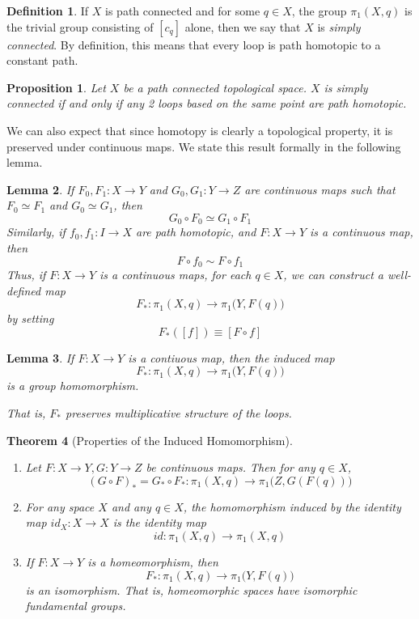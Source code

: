 \documentclass{article}
\newtheorem{theorem}{Theorem}[section]
\newtheorem{proposition}[theorem]{Proposition}
\newtheorem{lemma}[theorem]{Lemma}
\theoremstyle{remark}
\theoremstyle{definition}
\newtheorem{definition}{Definition}[section]
\begin{document}
  \begin{definition}
  If $X$ is path connected and for some $q \in X$, the group $\pi_1 (X, q)$ is the trivial group consisting of $[c_q]$ alone, then we say that $X$ is \textit{simply connected}. By definition, this means that every loop is path homotopic to a constant path. 
  \end{definition}

  \begin{proposition}
  Let $X$ be a path connected topological space. $X$ is simply connected if and only if any 2 loops based on the same point are path homotopic. 
  \end{proposition}

  We can also expect that since homotopy is clearly a topological property, it is preserved under continuous maps. We state this result formally in the following lemma.

  \begin{lemma}
  If $F_0, F_1: X \longrightarrow Y$ and $G_0, G_1: Y \longrightarrow Z$ are continuous maps such that $F_0 \simeq F_1$ and $G_0 \simeq G_1$, then 
  \[G_0 \circ F_0 \simeq G_1 \circ F_1\]
  Similarly, if $f_0, f_1: I \longrightarrow X$ are path homotopic, and $F: X \longrightarrow Y$ is a continuous map, then 
  \[F \circ f_0 \sim F \circ f_1\]
  Thus, if $F: X \longrightarrow Y$ is a continuous maps, for each $q \in X$, we can construct a well-defined map
  \[F_*: \pi_1 (X, q) \longrightarrow \pi_1 \big( Y, F(q)\big)\]
  by setting
  \[F_* ([f]) \equiv [F \circ f]\]
  \end{lemma}

  \begin{lemma}
  If $F: X \longrightarrow Y$ is a contiuous map, then the induced map 
  \[F_* : \pi_1(X, q) \longrightarrow \pi_1 \big( Y, F(q)\big)\]
  is a group homomorphism. 
  That is, $F_*$ preserves multiplicative structure of the loops. 
  \end{lemma}

  \begin{theorem}[Properties of the Induced Homomorphism]
  \begin{enumerate}
      \item Let $F: X \longrightarrow Y, G: Y \longrightarrow Z$ be continuous maps. Then for any $q \in X$, 
      \[(G \circ F)_* = G_* \circ F_* : \pi_1 (X, q) \longrightarrow \pi_1 \big(Z, G(F(q))\big)\]
      \item For any space $X$ and any $q \in X$, the homomorphism induced by the identity map $id_X: X \longrightarrow X$ is the identity map 
      \[id: \pi_1 (X, q) \longrightarrow \pi_1 (X, q)\]
      \item If $F: X \longrightarrow Y$ is a homeomorphism, then 
      \[F_* : \pi_1 (X, q) \longrightarrow \pi_1\big( Y, F(q)\big)\]
      is an isomorphism. That is, homeomorphic spaces have isomorphic fundamental groups.  
  \end{enumerate}
  \end{theorem}
\end{document}

